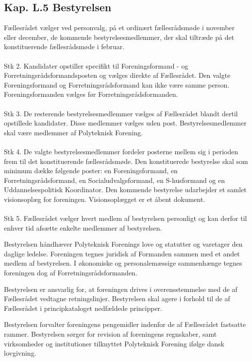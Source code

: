 \begin{list}
\subsection{Kap. L.5 Bestyrelsen}
\label{kap:bestyrelsen}
\item \label{L:best:valg} Fællesrådet vælger ved personvalg, på et ordinært fællesrådsmøde i november eller december, de kommende bestyrelsesmedlemmer, der skal tiltræde på det konstituerende fællesrådsmøde i februar. 
\\
\\
Stk 2. Kandidater opstiller specifikt til Foreningsformand - og Forretningsrådsformandsposten og vælges direkte af Fællesrådet. Den valgte Foreningsformand og Forretningsrådsformand kan ikke være samme person. Foreningsformanden vælges før Forretningsrådsformanden.
\\
\\
Stk 3. De resterende bestyrelsesmedlemmer vælges af Fællesrådet blandt dertil opstillede kandidater. Disse medlemmer vælges uden post. Bestyrelsesmedlemmer skal være medlemmer af Polyteknisk Forening.
\\
\\
Stk 4. De valgte bestyrelsesmedlemmer fordeler posterne mellem sig i perioden frem til det konstituerende fællesrådsmøde. Den konstituerede bestyrelse skal som minimum dække følgende poster: en Foreningsformand, en Forretningsrådsformand, en Socialudvalgsformand, en S-husformand og en Uddannelsespolitisk Koordinator. Den kommende bestyrelse udarbejder et samlet visionsoplæg for foreningen. Visionsoplægget er et åbent dokument.
\\
\\
Stk 5. Fællesrådet vælger hvert medlem af bestyrelsen personligt og kan derfor til enhver tid afsætte enkelte medlemmer af bestyrelsen.

\item Bestyrelsen håndhæver Polyteknisk Forenings love og statutter og varetager den daglige ledelse. Foreningen tegnes juridisk af Formanden sammen med et andet medlem af bestyrelsen. I økonomiske og personalemæssige sammenhænge tegnes foreningen dog af Forretningsrådsformanden.

\item Bestyrelsen er ansvarlig for, at foreningen drives i overensstemmelse med de af Fællesrådet vedtagne retningslinjer. Bestyrelsen skal agere i forhold til de af Fællesrådet i principkataloget nedfældede principper.

\item Bestyrelsen forvalter foreningens pengemidler indenfor de af Fællesrådet fastsatte rammer. Bestyrelsen sørger for revision af foreningens regnskaber, samt virksomheder og institutioner tilknyttet Polyteknisk Forening ifølge dansk lovgivning.


\end{list}
